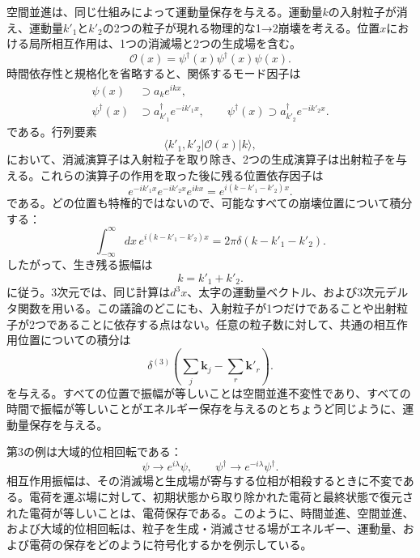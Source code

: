 空間並進は、同じ仕組みによって運動量保存を与える。運動量\(k\)の入射粒子が消え、運動量\(k'_1\)と\(k'_2\)の2つの粒子が現れる物理的な1→2崩壊を考える。位置\(x\)における局所相互作用は、1つの消滅場と2つの生成場を含む。
\begin{equation}
\mathcal{O}(x)=\psi^\dagger(x)\psi^\dagger(x)\psi(x).
\end{equation}
時間依存性と規格化を省略すると、関係するモード因子は
\begin{align}
\psi(x)&\supset a_k e^{ikx},
\\
\psi^\dagger(x)&\supset a_{k'_1}^\dagger e^{-ik'_1x},
\qquad
\psi^\dagger(x)\supset a_{k'_2}^\dagger e^{-ik'_2x}.
\end{align}
である。行列要素
\begin{equation}
\langle k'_1,k'_2|\mathcal{O}(x)|k\rangle,
\end{equation}
において、消滅演算子は入射粒子を取り除き、2つの生成演算子は出射粒子を与える。これらの演算子の作用を取った後に残る位置依存因子は
\begin{equation}
e^{-ik'_1x}e^{-ik'_2x}e^{ikx}
=e^{i(k-k'_1-k'_2)x}.
\end{equation}
である。どの位置も特権的ではないので、可能なすべての崩壊位置について積分する：
\begin{equation}
\int_{-\infty}^{\infty}dx\,
e^{i(k-k'_1-k'_2)x}
=2\pi\delta(k-k'_1-k'_2).
\end{equation}
したがって、生き残る振幅は
\begin{equation}
k=k'_1+k'_2.
\end{equation}
に従う。3次元では、同じ計算は\(d^3x\)、太字の運動量ベクトル、および3次元デルタ関数を用いる。この議論のどこにも、入射粒子が1つだけであることや出射粒子が2つであることに依存する点はない。任意の粒子数に対して、共通の相互作用位置についての積分は
\begin{equation}
\delta^{(3)}\!\left(
\sum_j\mathbf{k}_j-\sum_r\mathbf{k}'_r
\right).
\end{equation}
を与える。すべての位置で振幅が等しいことは空間並進不変性であり、すべての時間で振幅が等しいことがエネルギー保存を与えるのとちょうど同じように、運動量保存を与える。

第3の例は大域的位相回転である：
\begin{equation}
\psi\longrightarrow e^{i\lambda}\psi,
\qquad
\psi^\dagger\longrightarrow e^{-i\lambda}\psi^\dagger.
\end{equation}
相互作用振幅は、その消滅場と生成場が寄与する位相が相殺するときに不変である。電荷を運ぶ場に対して、初期状態から取り除かれた電荷と最終状態で復元された電荷が等しいことは、電荷保存である。このように、時間並進、空間並進、および大域的位相回転は、粒子を生成・消滅させる場がエネルギー、運動量、および電荷の保存をどのように符号化するかを例示している。

